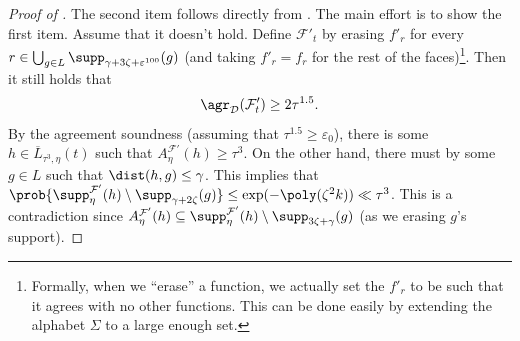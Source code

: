 \begin{proof}[Proof of ]
    The second item follows directly from . The main effort is to show the first item. Assume that it doesn't hold. Define \(\mathcal{F}'_t\) by erasing \(f'_r\) for every \(r \in \bigcup_{g \in L}\supp_{\gamma+3\zeta+\varepsilon^{100}}(g)\) (and taking \(f'_r=f_r\) for the rest of the faces)\footnote{Formally, when we ``erase'' a function, we actually set the \(f'_r\) to be such that it agrees with no other functions. This can be done easily by extending the alphabet \(\Sigma\) to a large enough set.}. Then it still holds that 
     \[\agr_{\mathcal{D}}(\mathcal{F}'_t) \geq 2\tau^{1.5}.\]
     By the agreement soundness (assuming that \(\tau^{1.5}\geq \varepsilon_0\)), there is some \(h \in \overline{L}_{\tau^3,\eta}(t)\) such that \(A_{\eta}^{\mathcal{F}'}(h) \geq \tau^3\). On the other hand, there must by some \(g \in L\) such that \(\dist(h,g) \leq \gamma\). This implies that \(\prob{\supp_{\eta}^{\mathcal{F}'}(h) \setminus \supp_{\gamma+2\zeta}(g)} \leq \exp(-\poly(\zeta^2 k)) \ll \tau^3\). This is a contradiction since \(A_{\eta}^{\mathcal{F}'}(h) \subseteq \supp_{\eta}^{\mathcal{F}'}(h) \setminus \supp_{3\zeta+\gamma}(g)\) (as we erasing \(g\)'s support).
\end{proof}


